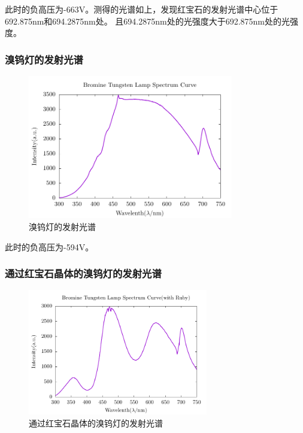 \documentclass[a4paper,UTF8]{ctexart}
\begin{document}
此时的负高压为-663V。测得的光谱如上，发现红宝石的发射光谱中心位于692.875nm和694.2875nm处。
且694.2875nm处的光强度大于692.875nm处的光强度。

\subsubsection{溴钨灯的发射光谱}

\begin{figure}[H]
    \centering
    \begin{minipage}[b]{0.9\textwidth}
        \centering
        \includegraphics[width=0.8\textwidth]{./r_2.pdf}
        \caption{溴钨灯的发射光谱}
    \end{minipage}
\end{figure}

此时的负高压为-594V。

\subsubsection{通过红宝石晶体的溴钨灯的发射光谱}

\begin{figure}[H]
    \centering
    \begin{minipage}[b]{0.9\textwidth}
        \centering
        \includegraphics[width=0.7\textwidth]{./r_3.pdf}
        \caption{通过红宝石晶体的溴钨灯的发射光谱}
    \end{minipage}
\end{figure}
\end{document}
